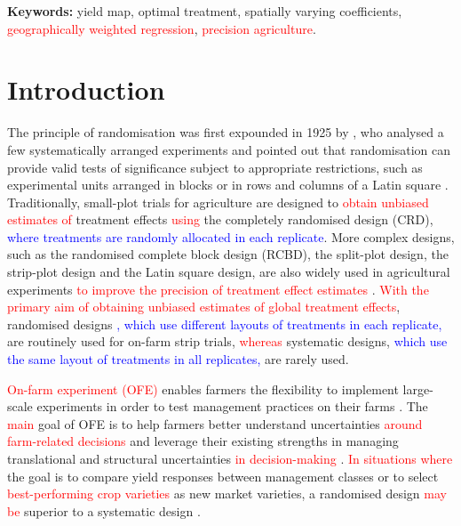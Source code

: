 \documentclass[a4paper]{article} 	%
\newcommand{\revision}[1]{\textcolor{red}{#1}}
\newcommand{\zc}[1]{\textcolor{blue}{#1}}
\begin{document}
 
{\bf Keywords:} yield map, optimal treatment, spatially varying coefficients, \revision{geographically weighted regression}, \revision{precision agriculture}. 

\section{Introduction}\label{Sec:Intro}

The principle of randomisation was first expounded in 1925 by \textcite{Fisher1934Statistical}, who analysed a few systematically arranged experiments and pointed out that randomisation can provide valid tests of significance subject to appropriate restrictions, such as experimental units arranged in blocks or in rows and columns of a Latin square \parencite{Verdooren2020History}. Traditionally, small-plot trials for agriculture are designed to \revision{obtain unbiased estimates of} treatment effects \revision{using} the completely randomised design (CRD), \zc{where treatments are randomly allocated in each replicate}. More complex designs, such as the randomised complete block design (RCBD), the split-plot design, the strip-plot design and the Latin square design, are also widely used in agricultural experiments \revision{to improve the precision of treatment effect estimates} \parencite{Petersen1994Agricultural}. \revision{With the primary aim of obtaining unbiased estimates of global treatment effects}, randomised designs \zc{, which use different layouts of treatments in each replicate,} are routinely used for on-farm strip trials, \revision{whereas} systematic designs, \zc{which use the same layout of treatments in all replicates,} are rarely used.



\revision{On-farm experiment (OFE)} enables farmers the flexibility to implement large-scale experiments in order to test management practices on their farms \parencite{Evans2020Assessment}. The \revision{main} goal of OFE is to help farmers better understand uncertainties \revision{around farm-related decisions} and leverage their existing strengths in managing translational and structural uncertainties \revision{in decision-making} \parencite{Cook2013Onfarm}. \revision{In situations where} the goal is to compare yield responses between management classes or to select \revision{best-performing crop varieties} as new market varieties, a randomised design \revision{may be} superior to a systematic design \parencite{Pringle2004FieldScale, Selle2019Flexible}. 
\end{document}
